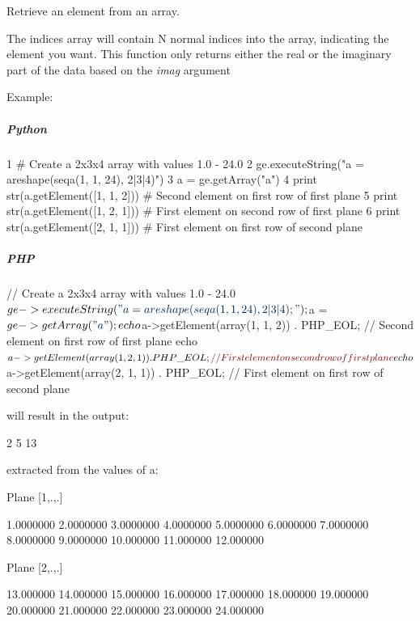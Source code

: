 Retrieve an element from an array. 

The indices array will contain N normal indices into the array, indicating the element you want. This function only returns either the real or the imaginary part of the data based on the {\itshape imag} argument

Example\-:

\subparagraph*{Python}


\begin{DoxyCode}
1 \textcolor{comment}{# Create a 2x3x4 array with values 1.0 - 24.0}
2 ge.executeString(\textcolor{stringliteral}{"a = areshape(seqa(1, 1, 24), 2|3|4)"})
3 a = ge.getArray(\textcolor{stringliteral}{"a"})
4 \textcolor{keywordflow}{print} str(a.getElement([1, 1, 2])) \textcolor{comment}{# Second element on first row of first plane}
5 \textcolor{keywordflow}{print} str(a.getElement([1, 2, 1])) \textcolor{comment}{# First element on second row of first plane}
6 \textcolor{keywordflow}{print} str(a.getElement([2, 1, 1])) \textcolor{comment}{# First element on first row of second plane}
\end{DoxyCode}


\subparagraph*{P\-H\-P}


\begin{DoxyCode}
\textcolor{comment}{// Create a 2x3x4 array with values 1.0 - 24.0}
$ge->executeString(\textcolor{stringliteral}{"a = areshape(seqa(1, 1, 24), 2|3|4);"});
$a = $ge->getArray(\textcolor{stringliteral}{"a"});
echo $a->getElement(array(1, 1, 2)) . PHP\_EOL; \textcolor{comment}{// Second element on first row of first plane}
echo $a->getElement(array(1, 2, 1)) . PHP\_EOL; \textcolor{comment}{// First element on second row of first plane}
echo $a->getElement(array(2, 1, 1)) . PHP\_EOL; \textcolor{comment}{// First element on first row of second plane}
\end{DoxyCode}
 will result in the output\-: 
\begin{DoxyCode}
2
5
13
\end{DoxyCode}
 extracted from the values of a\-: 
\begin{DoxyCode}
Plane [1,.,.]

       1.0000000        2.0000000        3.0000000        4.0000000
       5.0000000        6.0000000        7.0000000        8.0000000
       9.0000000        10.000000        11.000000        12.000000

Plane [2,.,.]

       13.000000        14.000000        15.000000        16.000000
       17.000000        18.000000        19.000000        20.000000
       21.000000        22.000000        23.000000        24.000000
\end{DoxyCode}



